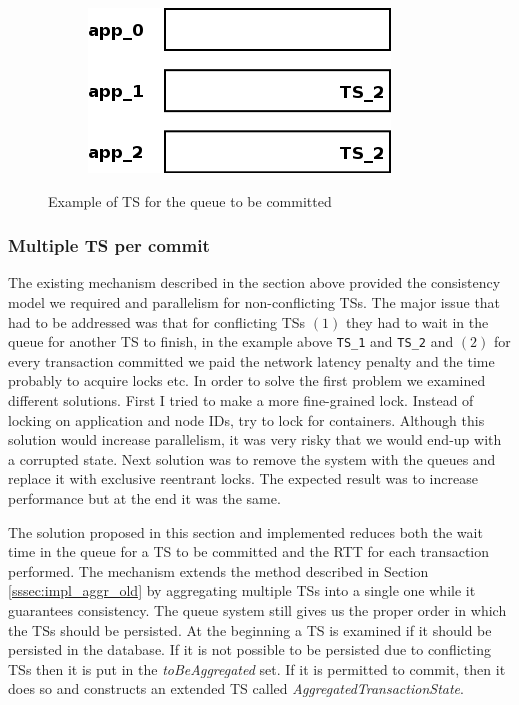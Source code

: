 \begin{figure}
\begin{subfigure}[t]{0.3\textwidth}
    \caption{}
    \label{fig:impl_tx_aggr_sub3}
  \end{subfigure}
  \qquad
  \begin{subfigure}[t]{0.3\textwidth}
    \includegraphics[scale=0.4]{resources/images/Implementation/commit_system_4.png}
    \caption{}
    \label{fig:impl_tx_aggr_sub4}
  \end{subfigure}

  \caption{Example of TS for the queue to be committed}
  \label{fig:impl_tx_aggr_queue}
\end{figure}

\subsubsection{Multiple TS per commit}
\label{sssec:impl_aggr_new}
The existing mechanism described in the section above provided the
consistency model we required and parallelism for
non-conflicting TSs. The major issue that had to be addressed was that
for conflicting TSs $(1)$ they had to wait in the queue for another TS
to finish, in the example above \texttt{TS\_1} and \texttt{TS\_2} and
$(2)$ for every transaction committed we paid the network latency
penalty and the time probably to acquire locks etc. In order to solve
the first problem we examined different solutions. First I tried to
make a more fine-grained lock. Instead of locking on application and
node IDs, try to lock for containers. Although this solution would
increase parallelism, it was very risky that we would end-up with a
corrupted state. Next solution was to remove the system with the
queues and replace it with exclusive reentrant locks. The expected
result was to increase performance but at the end it was the same.

The solution proposed in this section and implemented reduces both the
wait time in the queue for a TS to be committed and the RTT for each
transaction performed. The mechanism extends the method described in
Section \ref{sssec:impl_aggr_old} by aggregating multiple TSs into a
single one while it guarantees consistency. The queue system still
gives us the proper order in which the TSs should be persisted. At the
beginning a TS
is examined if it should be persisted in the database. If it is not
possible to be persisted due to conflicting TSs then it is put in the
\emph{toBeAggregated} set. If it is permitted to commit, then it does so
and constructs an extended TS called
\emph{AggregatedTransactionState}.

